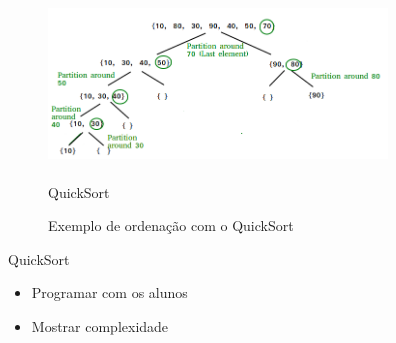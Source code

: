 \begin{frame}	
	\begin{block}{}	
		 \begin{figure}[!htb]
			\centering	  				
			\includegraphics[height=5cm, width = 9cm]{./pic/QuickSort2.png}
			\caption{QuickSort}
			\label{fig_merge}
		\end{figure}
	\end{block}
\end{frame}

\begin{frame}{}
	\begin{figure}[h!]
		\centering    
		  \caption{Exemplo de ordenação com o QuickSort}
	 \end{figure} 
\end{frame}

\begin{frame}
	\begin{block}{QuickSort}
		\begin{itemize}
			\item Programar com os alunos
			\item Mostrar complexidade
		\end{itemize}
	\end{block}
\end{frame}

